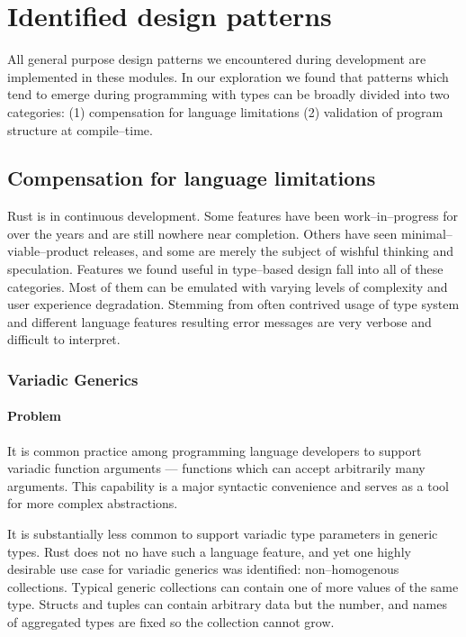 \section{Identified design patterns}

All general purpose design patterns we encountered during development are implemented in these modules.
In our exploration we found that patterns which tend to emerge during programming with types can be broadly divided into two categories: (1) compensation for language limitations (2) validation of program structure at compile--time.

\subsection{Compensation for language limitations}

Rust is in continuous development. 
Some features have been work--in--progress for over the years and are still nowhere near completion. 
Others have seen minimal--viable--product releases, and some are merely the subject of wishful thinking and speculation. 
Features we found useful in type--based design fall into all of these categories. 
Most of them can be emulated with varying levels of complexity and user experience degradation.
Stemming from often contrived usage of type system and different language features
resulting error messages are very verbose and difficult to interpret.

\subsubsection{Variadic Generics}

\paragraph{Problem}

It is common practice among programming language developers to support variadic function arguments --- functions which can accept arbitrarily many arguments.
This capability is a major syntactic convenience and serves as a tool for more complex abstractions.

It is substantially less common to support variadic type parameters in generic types. Rust does not no have such a language feature,
and yet one highly desirable use case for variadic generics was identified: non--homogenous collections. 
Typical generic collections can contain one of more values of the same type.
Structs and tuples can contain arbitrary data but the number, and names of aggregated types are fixed so the collection cannot grow.

